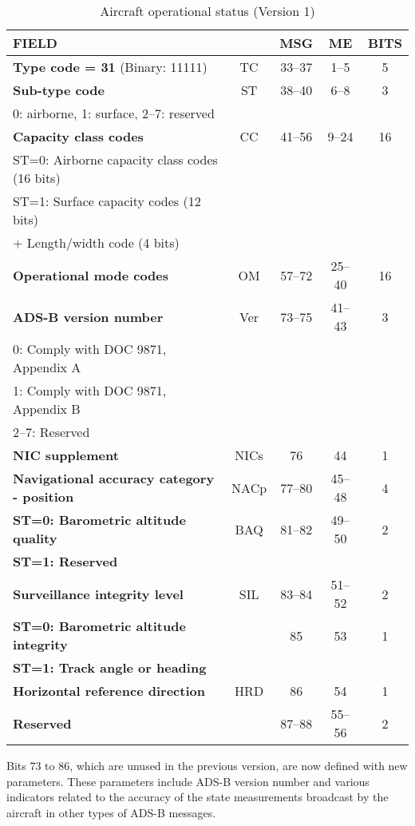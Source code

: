 \begin{table}[ht]
\caption{Aircraft operational status (Version 1)}
\label{tb:adsb-operational-status-v1}
\footnotesize
\begin{tabular}{|l|c|c|c|c|}
\hline
\textbf{FIELD} &  & \textbf{MSG} & \textbf{ME} & \textbf{BITS} \\ \hline \hline
\textbf{Type code = 31} (Binary: 11111) & TC & 33--37 & 1--5 & 5 \\ \hline
\textbf{Sub-type code} & ST & 38--40 & 6--8 & 3\\
0: airborne, 1: surface, 2--7: reserved &&&&  \\ \hline
\textbf{Capacity class codes} & CC & 41--56 & 9--24 & 16 \\
ST=0: Airborne capacity class codes (16 bits) &&&& \\
ST=1: Surface capacity codes (12 bits) &&&& \\
\quad\qquad+ Length/width code (4 bits) &&&& \\ \hline
\textbf{Operational mode codes} & OM & 57--72 & 25--40 & 16 \\ \hline
\textbf{ADS-B version number} & Ver & 73--75 & 41--43 & 3\\ 
0: Comply with DOC 9871, Appendix A &&&& \\
1: Comply with DOC 9871, Appendix B &&&& \\
2--7: Reserved &&&& \\ \hline
\textbf{NIC supplement} & NICs & 76 & 44 & 1 \\ \hline
\textbf{Navigational accuracy category - position} & NACp & 77--80 & 45--48 & 4 \\ \hline
\textbf{ST=0: Barometric altitude quality} & BAQ & 81--82 & 49--50 & 2\\
\textbf{ST=1: Reserved} &&&& \\ \hline
\textbf{Surveillance integrity level} & SIL & 83--84 & 51--52 & 2 \\ \hline
\textbf{ST=0: Barometric altitude integrity} & & 85 & 53 & 1\\
\textbf{ST=1: Track angle or heading} & & & &  \\ \hline
\textbf{Horizontal reference direction} & HRD & 86 & 54 & 1 \\ \hline
\textbf{Reserved} & & 87--88 & 55--56 & 2 \\ \hline
\end{tabular}
\end{table}

Bits 73 to 86, which are unused in the previous version, are now defined with new parameters. These parameters include ADS-B version number and various indicators related to the accuracy of the state measurements broadcast by the aircraft in other types of ADS-B messages.

